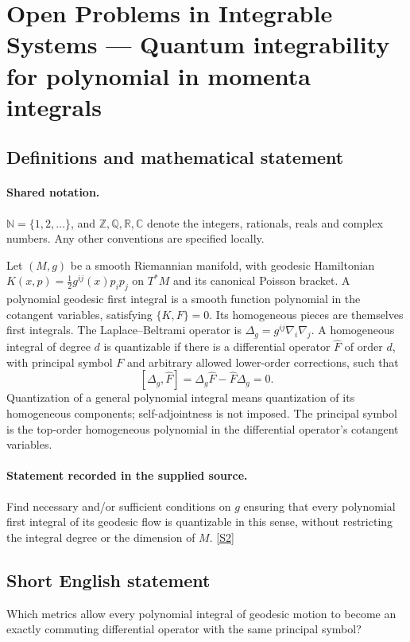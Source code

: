 \documentclass[11pt]{article}
\newcommand{\sref}[2]{\hyperlink{source:#1:#2}{[S#2]}}
\begin{document}
\section{Open Problems in Integrable Systems — Quantum integrability for polynomial in momenta integrals}\label{statement}

\subsection{Definitions and mathematical statement}

\paragraph{Shared notation.}$\mathbb N=\{1,2,\ldots\}$, and $\mathbb Z,\mathbb Q,\mathbb R,\mathbb C$ denote the integers, rationals, reals and complex numbers. Any other conventions are specified locally.


Let $(M,g)$ be a smooth Riemannian manifold, with geodesic Hamiltonian $K(x,p)=\tfrac12g^{ij}(x)p_ip_j$ on $T^*M$ and its canonical Poisson bracket. A polynomial geodesic first integral is a smooth function polynomial in the cotangent variables, satisfying $\{K,F\}=0$. Its homogeneous pieces are themselves first integrals. The Laplace--Beltrami operator is $\Delta_g=g^{ij}\nabla_i\nabla_j$. A homogeneous integral of degree $d$ is quantizable if there is a differential operator $\widehat F$ of order $d$, with principal symbol $F$ and arbitrary allowed lower-order corrections, such that
\[[\Delta_g,\widehat F]=\Delta_g\widehat F-\widehat F\Delta_g=0.\]
Quantization of a general polynomial integral means quantization of its homogeneous components; self-adjointness is not imposed. The principal symbol is the top-order homogeneous polynomial in the differential operator's cotangent variables.
\paragraph{Statement recorded in the supplied source.}
Find necessary and/or sufficient conditions on $g$ ensuring that every polynomial first integral of its geodesic flow is quantizable in this sense, without restricting the integral degree or the dimension of $M$. \sref{statement}{2}
\subsection{Short English statement}
Which metrics allow every polynomial integral of geodesic motion to become an exactly commuting differential operator with the same principal symbol?
\end{document}
